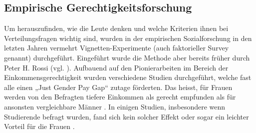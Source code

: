 \documentclass[a4paper,12pt]{article}
\renewcommand{\baselinestretch}{1.1}
\newif\ifcomments
\newcommand{\comment}[1]{%
    \ifcomments\marginpar{\renewcommand{\baselinestretch}{1}\tiny\hspace*{-1.1em}\colorbox{gray!20}%
    {\textcolor{red}{\parbox[t]{.9in}{\raggedright #1}}}}\fi}
\begin{document}
\subsection{Empirische Gerechtigkeitsforschung}

Um herauszufinden, wie die Leute denken und welche Kriterien ihnen bei
Verteilungsfragen wichtig sind, wurden in der empirischen Sozialforschung in
den letzten Jahren vermehrt Vignetten-Experimente (auch faktorieller Survey
genannt) durchgeführt. Eingeführt wurde die Methode aber bereits früher durch
Peter H. Rossi (vgl. \citealp{Rossi-1979,Rossi-Nock-1982}). Aufbauend auf den
Pionierarbeiten im Bereich der Einkommensgerechtigkeit
\citep{Jasso-1980,Jasso-Rossi-1977,Jasso-Webster-1997} wurden verschiedene
Studien durchgeführt, welche fast alle einen „Just Gender Pay Gap“ zutage förderten. Das heisst, für Frauen werden von den Befragten tiefere Einkommen als gerecht empfunden als für ansonsten vergleichbare Männer \citep{Jasso-Webster-1997,Jann-2003,Gatskova-2015,Sauer-etal-2009}. In einigen Studien, insbesondere wenn Studierende befragt wurden, fand sich kein solcher Effekt \citep{Auspurg-2009} oder sogar ein leichter Vorteil für die Frauen \citep{Jasso-Webster-1999}. \\
\comment{einzelne Experimente ev. noch etwas ausführlicher diskutieren}
\end{document}
